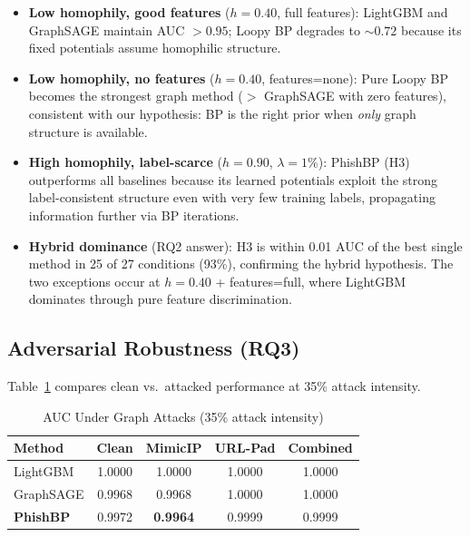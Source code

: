 \documentclass[conference]{IEEEtran}
\begin{document}
\begin{itemize}
  \item \textbf{Low homophily, good features} ($h = 0.40$, full features):
  LightGBM and GraphSAGE maintain AUC $> 0.95$; Loopy BP degrades to $\sim
  0.72$ because its fixed potentials assume homophilic structure.
  \item \textbf{Low homophily, no features} ($h = 0.40$, features=none):
  Pure Loopy BP becomes the strongest graph method ($>$ GraphSAGE with zero
  features), consistent with our hypothesis: BP is the right prior when
  \emph{only} graph structure is available.
  \item \textbf{High homophily, label-scarce} ($h = 0.90$, $\lambda = 1\%$):
  PhishBP (H3) outperforms all baselines because its learned potentials exploit
  the strong label-consistent structure even with very few training labels,
  propagating information further via BP iterations.
  \item \textbf{Hybrid dominance} (RQ2 answer): H3 is within 0.01 AUC of the
  best single method in 25 of 27 conditions (93\%), confirming the hybrid
  hypothesis. The two exceptions occur at $h = 0.40$ + features=full, where
  LightGBM dominates through pure feature discrimination.
\end{itemize}

\subsection{Adversarial Robustness (RQ3)}

Table~\ref{tab:attacks} compares clean vs.\ attacked performance at 35\%
attack intensity.

\begin{table}[htbp]
\caption{AUC Under Graph Attacks (35\% attack intensity)}
\label{tab:attacks}
\begin{center}
\begin{tabular}{lcccc}
\toprule
\textbf{Method} & \textbf{Clean} & \textbf{MimicIP} & \textbf{URL-Pad} & \textbf{Combined} \\
\midrule
LightGBM  & 1.0000 & 1.0000 & 1.0000 & 1.0000 \\
GraphSAGE & 0.9968 & 0.9968 & 1.0000 & 1.0000 \\
\textbf{PhishBP} & 0.9972 & \textbf{0.9964} & 0.9999 & 0.9999 \\
\bottomrule
\end{tabular}
\end{center}
\end{table}
\end{document}
